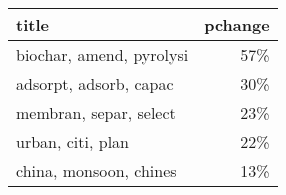 \begin{tabular}{lr}
\toprule
                    title &  pchange \\
\midrule
 biochar, amend, pyrolysi &      57\% \\
   adsorpt, adsorb, capac &      30\% \\
   membran, separ, select &      23\% \\
        urban, citi, plan &      22\% \\
   china, monsoon, chines &      13\% \\
\bottomrule
\end{tabular}
